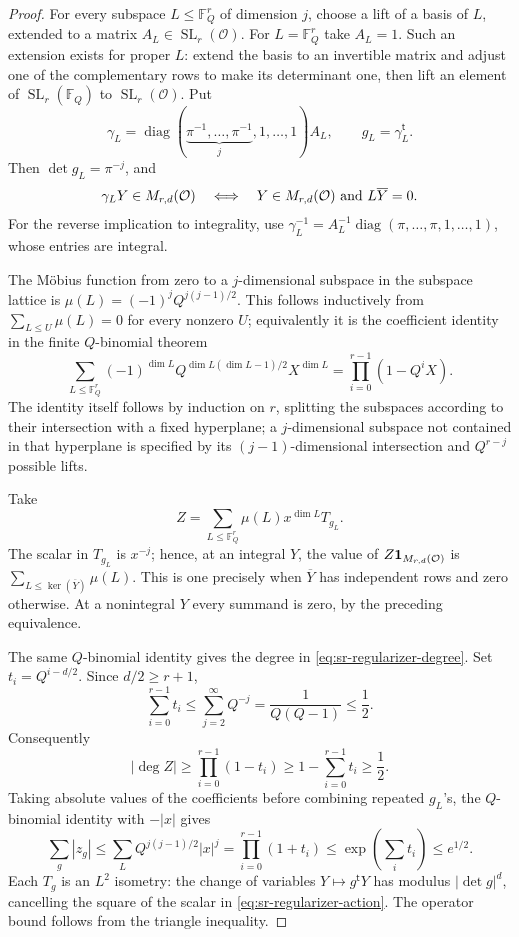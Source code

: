 \begin{proof}
For every subspace \(L\le\mathbb F_Q^r\) of dimension \(j\), choose a
lift of a basis of \(L\), extended to a matrix \(A_L\in
\operatorname{SL}_r(\mathcal O)\).  For \(L=\mathbb F_Q^r\) take
\(A_L=1\).  Such an extension exists for proper \(L\): extend the basis
to an invertible matrix and adjust one of the complementary rows to
make its determinant one, then lift an element of
\(\operatorname{SL}_r(\mathbb F_Q)\) to
\(\operatorname{SL}_r(\mathcal O)\).
Put
\[
 \gamma_L=\operatorname{diag}(\underbrace{\pi^{-1},\ldots,\pi^{-1}}_j,
                         1,\ldots,1)A_L,\qquad g_L=\gamma_L^{\mathsf t}.
\]
Then \(\det g_L=\pi^{-j}\), and
\[
 \gamma_LY\in M_{r,d}(\mathcal O)
 \quad\Longleftrightarrow\quad
 Y\in M_{r,d}(\mathcal O)\ \hbox{and}\ L\overline Y=0.
\]
For the reverse implication to integrality, use
\(\gamma_L^{-1}=A_L^{-1}\operatorname{diag}(\pi,\ldots,\pi,1,\ldots,1)\),
whose entries are integral.

The M\"obius function from zero to a \(j\)-dimensional subspace in the
subspace lattice is
\(\mu(L)=(-1)^jQ^{j(j-1)/2}\).  This follows inductively from
\(\sum_{L\le U}\mu(L)=0\) for every nonzero \(U\); equivalently it is the
coefficient identity in the finite \(Q\)-binomial theorem
\[
 \sum_{L\le\mathbb F_Q^r}
    (-1)^{\dim L}Q^{\dim L(\dim L-1)/2}X^{\dim L}
 =\prod_{i=0}^{r-1}(1-Q^iX).
\]
The identity itself follows by induction on \(r\), splitting the
subspaces according to their intersection with a fixed hyperplane; a
\(j\)-dimensional subspace not contained in that hyperplane is specified
by its \((j-1)\)-dimensional intersection and \(Q^{r-j}\) possible
lifts.

Take
\[
 Z=\sum_{L\le\mathbb F_Q^r}\mu(L)x^{\dim L}T_{g_L}.
\]
The scalar in \(T_{g_L}\) is \(x^{-j}\); hence, at an integral \(Y\),
the value of \(Z{\bf1}_{M_{r,d}(\mathcal O)}\) is
\(\sum_{L\le\ker(\overline Y)}\mu(L)\).  This is one precisely when
\(\overline Y\) has independent rows and zero otherwise.  At a
nonintegral \(Y\) every summand is zero, by the preceding equivalence.

The same \(Q\)-binomial identity gives the degree in
\eqref{eq:sr-regularizer-degree}.  Set \(t_i=Q^{i-d/2}\).  Since
\(d/2\ge r+1\),
\[
 \sum_{i=0}^{r-1}t_i
 \le \sum_{j=2}^{\infty}Q^{-j}
 =\frac{1}{Q(Q-1)}\le\frac12.
\]
Consequently
\[
 |\deg Z|\ge\prod_{i=0}^{r-1}(1-t_i)
 \ge1-\sum_{i=0}^{r-1}t_i\ge\frac12.
\]
Taking absolute values of the coefficients before combining repeated
\(g_L\)'s, the \(Q\)-binomial identity with \(-|x|\) gives
\[
 \sum_g|z_g|
 \le\sum_LQ^{j(j-1)/2}|x|^j
 =\prod_{i=0}^{r-1}(1+t_i)
 \le\exp\left(\sum_it_i\right)\le e^{1/2}.
\]
Each \(T_g\) is an \(L^2\) isometry: the change of variables
\(Y\mapsto g^{\mathsf t}Y\) has modulus \(|\det g|^d\), cancelling the
square of the scalar in \eqref{eq:sr-regularizer-action}.  The operator
bound follows from the triangle inequality.
\end{proof}

